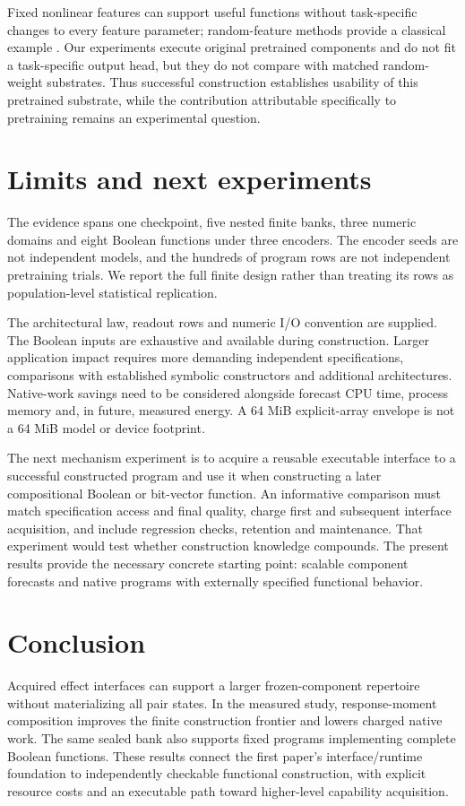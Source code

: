 \documentclass[11pt]{article}
\begin{document}
Fixed nonlinear features can support useful functions without task-specific
changes to every feature parameter; random-feature methods provide a classical
example \cite{randomfeatures}. Our experiments execute original pretrained
components and do not fit a task-specific output head, but they do not compare
with matched random-weight substrates. Thus successful construction establishes
usability of this pretrained substrate, while the contribution attributable
specifically to pretraining remains an experimental question.

\section{Limits and next experiments}
The evidence spans one checkpoint, five nested finite banks, three numeric
domains and eight Boolean functions under three encoders. The encoder seeds
are not independent models, and the hundreds of program rows are not independent
pretraining trials. We report the full finite design rather than treating its
rows as population-level statistical replication.

The architectural law, readout rows and numeric I/O convention are supplied.
The Boolean inputs are exhaustive and available during construction. Larger
application impact requires more demanding independent specifications,
comparisons with established symbolic constructors and additional architectures.
Native-work savings need to be considered alongside forecast CPU time, process
memory and, in future, measured energy. A 64 MiB explicit-array envelope is not
a 64 MiB model or device footprint.

The next mechanism experiment is to acquire a reusable executable interface
to a successful constructed program and use it when constructing a later
compositional Boolean or bit-vector function. An informative comparison must
match specification access and final quality, charge first and subsequent
interface acquisition, and include regression checks, retention and maintenance.
That experiment would test whether construction knowledge compounds. The present
results provide the necessary concrete starting point: scalable component
forecasts and native programs with externally specified functional behavior.

\section{Conclusion}
Acquired effect interfaces can support a larger frozen-component repertoire
without materializing all pair states. In the measured study, response-moment
composition improves the finite construction frontier and lowers charged native
work. The same sealed bank also supports fixed programs implementing complete
Boolean functions. These results connect the first paper's interface/runtime
foundation to independently checkable functional construction, with explicit
resource costs and an executable path toward higher-level capability acquisition.
\end{document}
